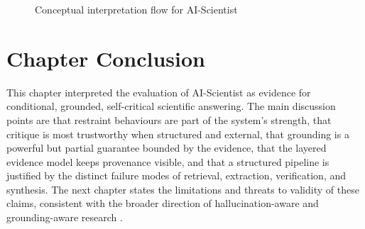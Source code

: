 \begin{figure}[!htbp]
\centering
{}
\caption{Conceptual interpretation flow for AI-Scientist}
\label{fig:discussion_flow}
\end{figure}

\section{Chapter Conclusion }

This chapter interpreted the evaluation of AI-Scientist as evidence for conditional, grounded, self-critical
scientific answering. The main discussion points are that restraint behaviours are part of the system's strength,
that critique is most trustworthy when structured and external, that grounding is a powerful but partial guarantee
bounded by the evidence, that the layered evidence model keeps provenance visible, and that a structured pipeline
is justified by the distinct failure modes of retrieval, extraction, verification, and synthesis. The next chapter
states the limitations and threats to validity of these claims, consistent with the broader direction of
hallucination-aware and grounding-aware research \cite{ji2023hallucination,huang2023hallucinationsurvey,min2023factscore}.

